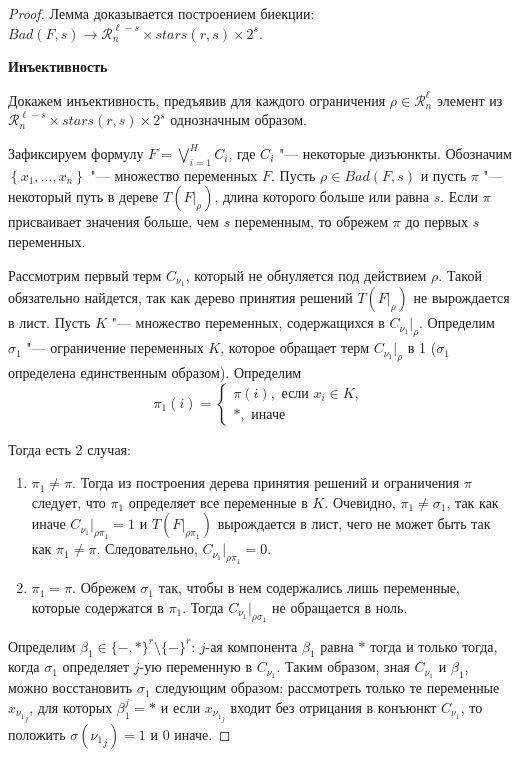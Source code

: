 \documentclass[12pt]{article}
\theoremstyle{plain}
\theoremstyle{remark}
\theoremstyle{definition}
\begin{document}
\begin{proof}
Лемма доказывается построением биекции: $Bad(F, s) \to \mathcal{R}_n^{\ell - s} \times stars(r, s) \times 2 ^ s$.

\textbf{Инъективность} 

Докажем инъективность, предъявив для каждого ограничения $\rho \in \mathcal{R}_n^{\ell}$ элемент из $\mathcal{R}_n^{\ell - s} \times stars(r, s) \times 2 ^ s$ однозначным образом.

Зафиксируем формулу $F = \bigvee_{i = 1}^H C_i$, где $C_i$ "--- некоторые дизъюнкты. Обозначим $\left\{ x_1, \ldots, x_n \right\}$ "--- множество переменных $F$. Пусть $\rho \in Bad(F, s)$ и пусть $\pi$ "--- некоторый путь в дереве  $T(F|_\rho)$, длина которого больше или равна $s$. Если $\pi$ присваивает значения больше, чем $s$ переменным, то обрежем $\pi$ до первых $s$ переменных. %

Рассмотрим первый терм $C_{\nu_1}$, который  не обнуляется под действием $\rho$. Такой обязательно найдется, так как дерево принятия решений $T(F|_\rho)$ не вырождается в лист. Пусть $K$ "--- множество переменных, содержащихся в $C_{\nu_1}|_\rho$. Определим $\sigma_1$ "--- ограничение переменных $K$, которое обращает терм $C_{\nu_1}|_\rho$ в 1 ($\sigma_1$ определена единственным образом). Определим
\[ \pi_1(i) = \begin{cases} \pi(i), \text{ если } x_i \in K, \\
  *, \text{ иначе}  \end{cases} \]

Тогда есть 2 случая:
\begin{enumerate}
\item $\pi_1 \ne \pi$. Тогда из построения дерева принятия решений и ограничения $\pi$ следует, что  $\pi_1$ определяет все переменные в $K$. Очевидно, $\pi_1 \ne \sigma_1$, так как иначе $C_{\nu_1}|_{\rho\pi_1} = 1$ и $T(F|_{\rho\pi_1})$ вырождается в лист, чего не может быть так как $\pi_1 \ne \pi$. Следовательно, $C_{\nu_1}|_{\rho\pi_1} = 0$.
\item $\pi_1 = \pi$. Обрежем $\sigma_1$ так, чтобы в нем содержались лишь переменные, которые содержатся в $\pi_1$. Тогда $C_{\nu_1}|_{\rho\sigma_1}$ не обращается в ноль.
\end{enumerate}

Определим $\beta_1 \in \{-, *\}^r \setminus \{-\}^r$: $j$-ая компонента $\beta_1$ равна $*$ тогда и только тогда, когда $\sigma_1$ определяет $j$-ую переменную в  $C_{\nu_1}$. Таким образом, зная $C_{\nu_1}$ и $\beta_1$, можно восстановить $\sigma_1$ следующим образом: рассмотреть только те переменные $x_{{\nu_1}_j}$, для которых $\beta_1^j = *$ и если $x_{{\nu_1}_j}$ входит без отрицания в  конъюнкт $C_{\nu_1}$, то положить $\sigma({\nu_1}_j) = 1$ и 0 иначе.


\end{proof}
\end{document}
